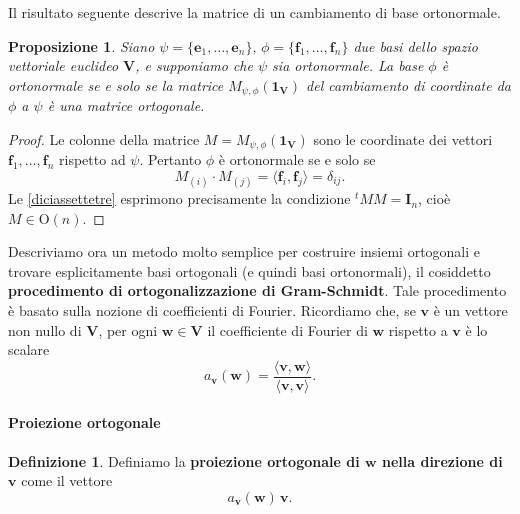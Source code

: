 \documentclass{article}
\theoremstyle{plain}
\newtheorem{prop}[thm]{Proposizione}
\theoremstyle{definition}
\newtheorem{defn}{Definizione}[section]
\theoremstyle{remark}
\begin{document}
\vspace{10pt}

Il risultato seguente descrive la matrice di un cambiamento di base ortonormale.

\vspace{10pt}

\begin{bxthm}
\begin{prop}
Siano $\psi = \{\mathbf{e}_1, \ldots, \mathbf{e}_n\},\,\phi = \{\mathbf{f}_1, \ldots, \mathbf{f}_n\}$ due basi 
dello spazio vettoriale euclideo $\mathbf{V}$, e supponiamo che $\psi$ sia ortonormale. La base $\phi$ è 
ortonormale se e solo se la matrice $M_{\psi,\phi}(\mathbf{1_V})$ del cambiamento di coordinate da 
$\phi$ a $\psi$ è una matrice ortogonale.
\end{prop}    
\end{bxthm}
\begin{proof}
Le colonne della matrice $M = M_{\psi,\phi}(\mathbf{1_V})$ sono le coordinate dei vettori 
$\mathbf{f}_1, \ldots, \mathbf{f}_n$ rispetto ad $\psi$. Pertanto $\phi$ è ortonormale se e solo se
\begin{equation}\label{diciassettetre}
M_{(i)} \cdot M_{(j)} = \langle \mathbf{f}_i, \mathbf{f}_j \rangle = \delta_{ij}.    
\end{equation}
Le \ref{diciassettetre} esprimono precisamente la condizione ${}^tMM = \mathbf{I}_n$, cioè $M \in \mathrm{O}(n)$.
\end{proof}

\vspace{10pt}

Descriviamo ora un metodo molto semplice per costruire insiemi ortogonali e trovare esplicitamente 
basi ortogonali (e quindi basi ortonormali), il cosiddetto \textbf{procedimento di ortogonalizzazione di Gram-Schmidt}. 
Tale procedimento è basato sulla nozione di coefficienti di Fourier. Ricordiamo che, se $\mathbf{v}$ è un vettore 
non nullo di $\mathbf{V}$, per ogni $\mathbf{w} \in \mathbf{V}$ il coefficiente di Fourier di $\mathbf{w}$ rispetto a $\mathbf{v}$ è lo scalare
\[
a_\mathbf{v}(\mathbf{w}) = \dfrac{\langle \mathbf{v}, \mathbf{w} \rangle}{\langle \mathbf{v}, \mathbf{v} \rangle}.
\]

\vspace{10pt}

\paragraph{Proiezione ortogonale}
\begin{bxthm}
\begin{defn}
Definiamo la \textbf{proiezione ortogonale di $\mathbf{w}$ nella direzione di $\mathbf{v}$} come il vettore
\[
a_\mathbf{v}(\mathbf{w}) \, \mathbf{v}.
\]    
\end{defn}
\end{bxthm}
\end{document}
